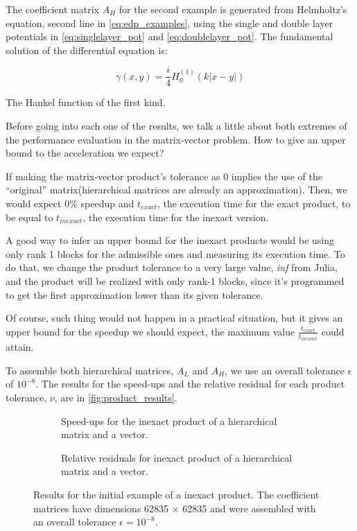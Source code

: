 The coefficient matrix $A_{H}$ for the second example is generated from Helmholtz's equation, second line in \autoref{eq:edp_examples}, using the single and double layer potentials in \autoref{eq:singlelayer_pot} and \autoref{eq:doublelayer_pot}. The fundamental solution of the differential equation is:

\begin{equation}
    \gamma(x,y) = \frac{i}{4} H_{0}^{(1)}(k|x-y|)
\end{equation}

The Hankel function of the first kind.

Before going into each one of the results, we talk a little about both extremes of the performance evaluation in the matrix-vector problem. How to give an upper bound to the acceleration we expect?

If making the matrix-vector product's tolerance as 0 implies the use of the “original”   matrix(hierarchical matrices are already an approximation). Then, we would expect 0$\%$ speedup and $t_{exact}$, the execution time for the exact product, to be equal to $t_{inexact}$, the execution time for the inexact version.

A good way to infer an upper bound for the inexact products would be using only rank 1 blocks for the admissible ones and measuring its execution time. To do that, we change the product tolerance to a very large value, \textit{inf} from Julia, and the product will be realized with only rank-1 blocks, since it's programmed to get the first approximation lower than its given tolerance.

Of course, such thing would not happen in a practical situation, but it gives an upper bound for the speedup we should expect, the maximum value $\frac{t_{exact}}{t_{inexact}}$ could attain.

To assemble both hierarchical matrices, $A_{L}$ and $A_{H}$, we use an overall tolerance $\epsilon$ of $10^{-8}$. The results for the speed-ups and the relative residual for each product tolerance, $\nu$, are in \autoref{fig:product_results}.

\begin{figure}[h!]
    \centering
    \begin{subfigure}[b]{0.45\linewidth}
        
        \caption{Speed-ups for the inexact product of a hierarchical matrix and a vector.}
    \end{subfigure}
    \begin{subfigure}[b]{0.45\linewidth}
        
        \caption{Relative residuals for inexact product of a hierarchical matrix and a vector.}
    \end{subfigure}
    \caption{Results for the initial example of a inexact product. The coefficient matrices have dimensions 62835 $\times$ 62835 and were assembled with an overall tolerance $\epsilon = 10^{-8}$.}
    \label{fig:product_results}
\end{figure}

